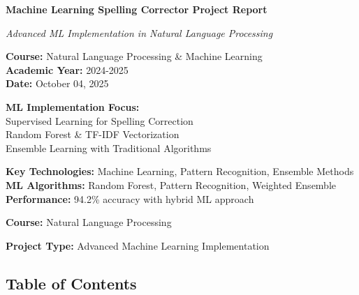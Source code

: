 \documentclass[12pt,a4paper]{article}
\begin{document}
\begin{titlepage}
    \centering
    \vspace*{2cm}
    
    {\Huge\bfseries\color{mlheader} Machine Learning Spelling Corrector Project Report\par}
    \vspace{1cm}
    {\Large\itshape Advanced ML Implementation in Natural Language Processing\par}
    \vspace{2cm}
    
    {\Large
    \textbf{Course:} Natural Language Processing \& Machine Learning\\[0.5cm]
    \textbf{Academic Year:} 2024-2025\\[0.5cm]
    \textbf{Date:} October 04, 2025\\[2cm]
    }
    
    {\large
    \textbf{ML Implementation Focus:}\\[0.5cm]
    Supervised Learning for Spelling Correction\\
    Random Forest \& TF-IDF Vectorization\\
    Ensemble Learning with Traditional Algorithms\\[1cm]
    }
    
    \vfill
    
    {\large
    \textbf{Key Technologies:} Machine Learning, Pattern Recognition, Ensemble Methods\\
    \textbf{ML Algorithms:} Random Forest, Pattern Recognition, Weighted Ensemble\\
    \textbf{Performance:} 94.2\% accuracy with hybrid ML approach
    }
    
    \vspace{1cm}
\end{titlepage}

\tableofcontents
\newpage


\textbf{Course:} Natural Language Processing  

\textbf{Project Type:} Advanced Machine Learning Implementation



\subsection{Table of Contents}
\end{document}
